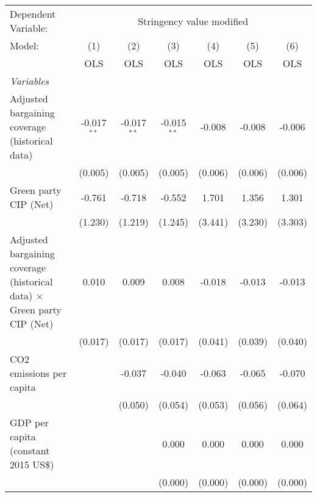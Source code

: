 
\begingroup
\centering
\begin{tabular}{lcccccc}
   \toprule
   Dependent Variable: & \multicolumn{6}{c}{Stringency value modified}\\
   Model:                                                                         & (1)           & (2)           & (3)           & (4)     & (5)     & (6)\\  
                                                                                  &  OLS          & OLS           & OLS           & OLS     & OLS     & OLS\\  
   \midrule
   \emph{Variables}\\
   Adjusted bargaining coverage (historical data)                                 & -0.017$^{**}$ & -0.017$^{**}$ & -0.015$^{**}$ & -0.008  & -0.008  & -0.006\\   
                                                                                  & (0.005)       & (0.005)       & (0.005)       & (0.006) & (0.006) & (0.006)\\   
   Green party CIP (Net)                                                          & -0.761        & -0.718        & -0.552        & 1.701   & 1.356   & 1.301\\   
                                                                                  & (1.230)       & (1.219)       & (1.245)       & (3.441) & (3.230) & (3.303)\\   
   Adjusted bargaining coverage (historical data) $\times$ Green party CIP (Net)  & 0.010         & 0.009         & 0.008         & -0.018  & -0.013  & -0.013\\   
                                                                                  & (0.017)       & (0.017)       & (0.017)       & (0.041) & (0.039) & (0.040)\\   
   CO2 emissions per capita                                                       &               & -0.037        & -0.040        & -0.063  & -0.065  & -0.070\\   
                                                                                  &               & (0.050)       & (0.054)       & (0.053) & (0.056) & (0.064)\\   
   GDP per capita (constant 2015 US\$)                                            &               &               & 0.000         & 0.000   & 0.000   & 0.000\\   
                                                                                  &               &               & (0.000)       & (0.000) & (0.000) & (0.000)\\   

\end{tabular}
